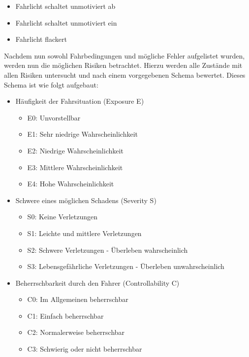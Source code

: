 \documentclass[a4paper,DIV=calc,ngerman]{scrartcl}
\begin{document}
\begin{itemize}
    \item Fahrlicht schaltet unmotiviert ab
    \item Fahrlicht schaltet unmotiviert ein
    \item Fahrlicht flackert
\end{itemize}

Nachdem nun sowohl Fahrbedingungen und mögliche Fehler aufgelistet wurden, werden nun die möglichen Risiken betrachtet. Hierzu werden alle Zustände mit allen Risiken untersucht und nach einem vorgegebenen Schema bewertet. Dieses Schema ist wie folgt aufgebaut:

\begin{itemize}
    \item Häufigkeit der Fahrsituation (Exposure E)
    \begin{itemize}
        \item E0: Unvorstellbar
        \item E1: Sehr niedrige Wahrscheinlichkeit
        \item E2: Niedrige Wahrscheinlichkeit
        \item E3: Mittlere Wahrscheinlichkeit
        \item E4: Hohe Wahrscheinlichkeit
    \end{itemize}
    \item Schwere eines möglichen Schadens (Severity S)
    \begin{itemize}
        \item S0: Keine Verletzungen
        \item S1: Leichte und mittlere Verletzungen
        \item S2: Schwere Verletzungen - Überleben wahrscheinlich
        \item S3: Lebensgefährliche Verletzungen - Überleben unwahrscheinlich
    \end{itemize}
    \item Beherrschbarkeit durch den Fahrer (Controllability C)
    \begin{itemize}
        \item C0: Im Allgemeinen beherrschbar
        \item C1: Einfach beherrschbar
        \item C2: Normalerweise beherrschbar
        \item C3: Schwierig oder nicht beherrschbar
    \end{itemize}
\end{itemize}
\end{document}
